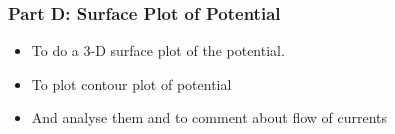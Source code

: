 \documentclass[11pt]{article}
\providecommand{\tightlist}{%
      \setlength{\itemsep}{0pt}\setlength{\parskip}{0pt}}
\begin{document}
    \subsubsection{Part D: Surface Plot of
Potential}\label{part-d-surface-plot-of-potential}

\begin{itemize}
\tightlist
\item
  To do a 3-D surface plot of the potential.
\item
  To plot contour plot of potential
\item
  And analyse them and to comment about flow of currents
\end{itemize}

	

	
		
	
	
		
			
		
	
		
			
		
	
		
			
		
	
		
			
		
	
		
			
		
	
		
			
		
	
		
			
		
	
		
			
		
	
		
			
		
	
		
			
		
	
\end{document}
